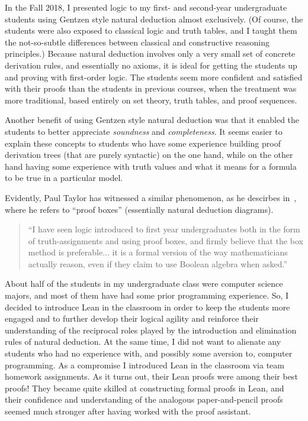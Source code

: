 In the Fall 2018, I presented logic to my first- and second-year undergraduate students using Gentzen style natural deduction almost exclusively. (Of course, the students were also exposed to classical logic and truth tables, and I taught them the not-so-subtle differences between classical and constructive reasoning principles.)
Because natural deduction involves only a very small set of concrete derivation rules, and essentially no axioms, it is ideal for getting the students up and proving with first-order logic. The students seem more confident and satisfied with their proofs than the students in previous courses, when the treatment was more traditional, based entirely on set theory, truth tables, and proof sequences.

Another benefit of using Gentzen style natural deduction was that it enabled the students to better appreciate \emph{soundness} and \emph{completeness}.  It seems easier to explain these concepts to students who have some experience building proof derivation trees (that are purely syntactic) on the one hand, while on the other hand having some experience with truth values and what it means for a formula to be true in a particular model.

Evidently, Paul Taylor has witnessed a similar phenomenon, as he descirbes in~\cite{MR1694820}, where he refers to ``proof boxes'' (essentially natural deduction diagrams).
\begin{quote}
``I have seen logic introduced to first year undergraduates
both in the form of truth-assignments and using proof boxes, and firmly
believe that the box method is preferable... %
it is a formal version of the way mathematicians
actually reason, even if they claim to use Boolean algebra when asked.''
\end{quote}

About half of the students in my undergraduate class were computer science majors, and most of them have had some prior programming experience. So, I decided to introduce Lean in the classroom in order to keep the students  more engaged and to further develop their logical agility and reinforce their understanding of the reciprocal roles played by the introduction and elimination rules of natural deduction. At the same time, I did not want to alienate any students who had no experience with, and possibly some aversion to, computer programming. As a compromise I introduced Lean in the classroom via team homework assignments. As it turns out, their Lean proofs were among their best proofs!  They became quite skilled at constructing formal proofs in Lean, and their confidence and understanding of the analogous paper-and-pencil proofs seemed much stronger after having worked with the proof assistant.


